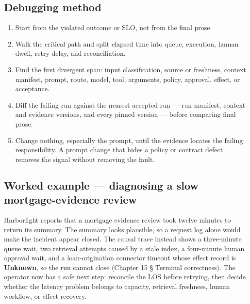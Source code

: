 \subsection{Debugging method}

\begin{enumerate}

\item Start from the violated outcome or SLO, not from the final prose.

\item Walk the critical path and split elapsed time into queue, execution, human dwell, retry delay, and reconciliation.

\item Find the first divergent span: input classification, source or freshness, context manifest, prompt, route, model, tool, arguments, policy, approval, effect, or acceptance.

\item Diff the failing run against the nearest accepted run — run manifest, context and evidence versions, and every pinned version — before comparing final prose.

\item Change nothing, especially the prompt, until the evidence locates the failing responsibility. A prompt change that hides a policy or contract defect removes the signal without removing the fault.

\end{enumerate}

\subsection{Worked example — diagnosing a slow mortgage-evidence review}

Harborlight reports that a mortgage evidence review took twelve minutes to return its summary. The summary looks plausible, so a request log alone would make the incident appear closed. The causal trace instead shows a three-minute queue wait, two retrieval attempts caused by a stale index, a four-minute human approval wait, and a loan-origination connector timeout whose effect record is \textbf{Unknown}, so the run cannot close (Chapter 15 § Terminal correctness). The operator now has a safe next step: reconcile the LOS before retrying, then decide whether the latency problem belongs to capacity, retrieval freshness, human workflow, or effect recovery.\par

